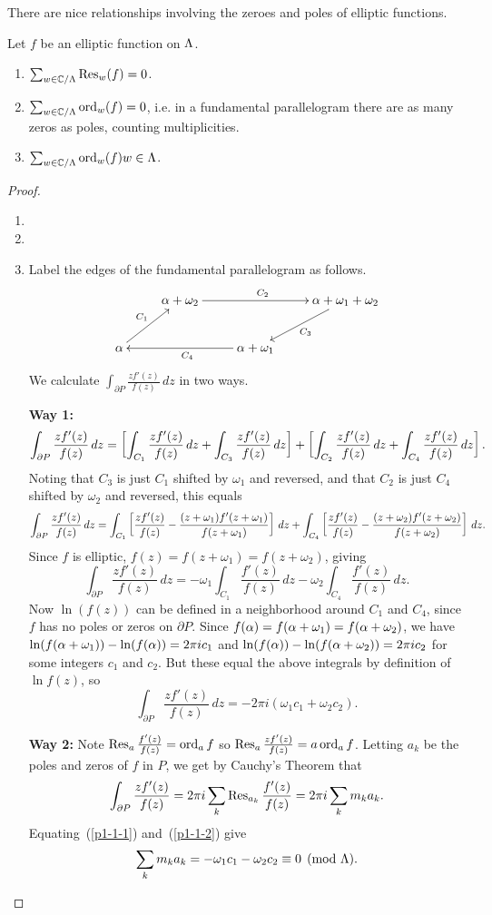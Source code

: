 There are nice relationships involving the zeroes and poles of elliptic functions.
\begin{thm}Let $f$ be an elliptic function on $\Lambda$.
\begin{enumerate}
\item $\sum_{w\in \mathbb{C}/\Lambda} \operatorname{Res}_w(f)=0$.
\item $\sum_{w\in \mathbb{C}/\Lambda} \operatorname{ord}_w(f)=0$, i.e. in a fundamental parallelogram there are as many zeros as poles, counting multiplicities.
\item $\sum_{w\in \mathbb{C}/\Lambda} \operatorname{ord}_w(f)w\in \Lambda$.
\end{enumerate}
\begin{proof}
\begin{enumerate}
\item
\item 
\item Label the edges of the fundamental parallelogram as follows.
\[
\xymatrix{
& \al+\omega_2 \ar[rr]^{C_2} & & \al+\omega_1+\omega_2\ar[ld]^{C_3} \\
\al\ar[ur]^{C_1} & &\al+\omega_1 \ar[ll]^{C_4}&
}
\]
We calculate $\int_{\partial P} \frac{zf'(z)}{f(z)}\,dz$ in two ways.

\textbf{Way 1:} 
\[
\int_{\partial P} \frac{zf'(z)}{f(z)} \,dz=\left[ {
\int_{C_1} \frac{zf'(z)}{f(z)}\,dz
+\int_{C_3} \frac{zf'(z)}{f(z)}\,dz
} \right]
+\left[ {
\int_{C_2} \frac{zf'(z)}{f(z)}\,dz
+\int_{C_4} \frac{zf'(z)}{f(z)}\,dz
} \right].
\]
Noting that $C_3$ is just $C_1$ shifted by $\omega_1$ and reversed, and that $C_2$ is just $C_4$ shifted by $\omega_2$ and reversed, this equals
\[
\int_{\partial P} \frac{zf'(z)}{f(z)} \,dz=
\int_{C_1} \left[ {\frac{zf'(z)}{f(z)}
-\frac{(z+\omega_1)f'(z+\omega_1)}{f(z+\omega_1 )}
} \right]\,dz
+
\int_{C_4} \left[ {\frac{zf'(z)}{f(z)}- \frac{(z+\omega_2)f'(z+\omega_2)}{f(z+\omega_2)}
} \right]\,dz.
\]
Since $f$ is elliptic, $f(z)=f(z+\omega_1)=f(z+\omega_2)$, giving
\[
\int_{\partial P} \frac{zf'(z)}{f(z)} \,dz=
-\omega_1\int_{C_1} \frac{f'(z)}{f(z)} \,dz-\omega_2\int_{C_4} \frac{f'(z)}{f(z)}\,dz.
\]
Now $\ln(f(z))$ can be defined in a neighborhood around $C_1$ and $C_4$, since $f$ has no poles or zeros on $\partial P$. Since $f(\alpha)=f(\alpha+\omega_1)=f(\alpha+\omega_2)$, we have $\ln(f(\alpha+\omega_1))-\ln(f(\alpha))=2\pi i c_1$ and $\ln(f(\alpha))-\ln(f(\alpha+\omega_2))=2\pi i c_2$ for some integers $c_1$ and $c_2$. But these equal the above integrals by definition of $\ln f(z)$, so
\begin{equation}\label{p1-1-1}
\int_{\partial P} \frac{zf'(z)}{f(z)} \,dz=
-2\pi i(\omega_1 c_1+\omega_2 c_2).
\end{equation}

\textbf{Way 2:}
Note $\operatorname{Res}_a \frac{f'(z)}{f(z)}=\operatorname{ord}_a f$ so $\operatorname{Res}_a \frac{zf'(z)}{f(z)}=a \operatorname{ord}_a f$. Letting $a_k$ be the poles and zeros of $f$ in $P$, we get by Cauchy's Theorem that
\begin{equation}\label{p1-1-2}
\int_{\partial P} \frac{zf'(z)}{f(z)}=2\pi i\sum_{k} \operatorname{Res}_{a_k} \frac{f'(z)}{f(z)}=2\pi i \sum_{k}m_k a_k.
\end{equation}
Equating~(\ref{p1-1-1}) and~(\ref{p1-1-2}) give
\[
\sum_{k}m_ka_k=-\omega_1c_1-\omega_2c_2\equiv 0\pmod{\Lambda}.
\]
\end{enumerate}
\end{proof}
\end{thm}
